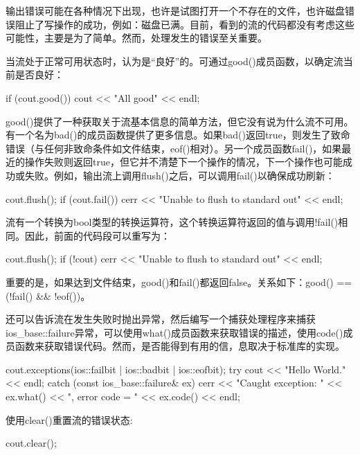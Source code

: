 
输出错误可能在各种情况下出现，也许是试图打开一个不存在的文件，也许磁盘错误阻止了写操作的成功，例如：磁盘已满。目前，看到的流的代码都没有考虑这些可能性，主要是为了简单。然而，处理发生的错误至关重要。

当流处于正常可用状态时，认为是“良好”的。可通过good()成员函数，以确定流当前是否良好：

\begin{cpp}
if (cout.good()) {
    cout << "All good" << endl;
}
\end{cpp}

good()提供了一种获取关于流基本信息的简单方法，但它没有说为什么流不可用。有一个名为bad()的成员函数提供了更多信息。如果bad()返回true，则发生了致命错误（与任何非致命条件如文件结束，eof()相对）。另一个成员函数fail()，如果最近的操作失败则返回true，但它并不清楚下一个操作的情况，下一个操作也可能成功或失败。例如，输出流上调用flush()之后，可以调用fail()以确保成功刷新：

\begin{cpp}
cout.flush();
if (cout.fail()) {
    cerr << "Unable to flush to standard out" << endl;
}
\end{cpp}

流有一个转换为bool类型的转换运算符，这个转换运算符返回的值与调用!fail()相同。因此，前面的代码段可以重写为：

\begin{cpp}
cout.flush();
if (!cout) {
    cerr << "Unable to flush to standard out" << endl;
}
\end{cpp}

重要的是，如果达到文件结束，good()和fail()都返回false。关系如下：good() == (!fail() \&\& !eof())。

还可以告诉流在发生失败时抛出异常，然后编写一个捕获处理程序来捕获ios\_base::failure异常，可以使用what()成员函数来获取错误的描述，使用code()成员函数来获取错误代码。然而，是否能得到有用的信，息取决于标准库的实现。

\begin{cpp}
cout.exceptions(ios::failbit | ios::badbit | ios::eofbit);
try {
    cout << "Hello World." << endl;
} catch (const ios_base::failure& ex) {
    cerr << "Caught exception: " << ex.what()
    << ", error code = " << ex.code() << endl;
}
\end{cpp}

使用clear()重置流的错误状态:

\begin{cpp}
cout.clear();
\end{cpp}

